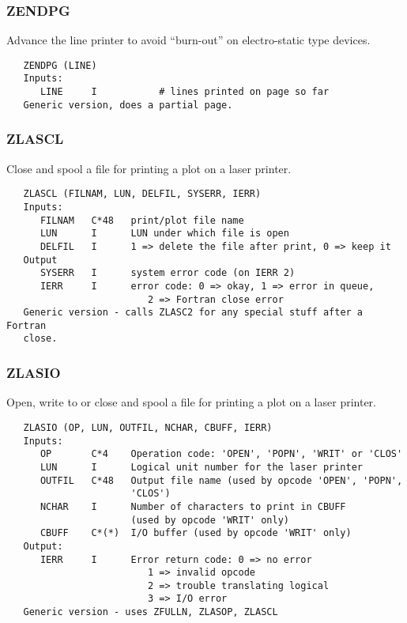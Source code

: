 \subsubsection{ZENDPG}
Advance the line printer to avoid ``burn-out'' on electro-static type
devices.
\begin{verbatim}
   ZENDPG (LINE)
   Inputs:
      LINE     I           # lines printed on page so far
   Generic version, does a partial page.
\end{verbatim}

\subsubsection{ZLASCL}
Close and spool a file for printing a plot on a laser printer.
\begin{verbatim}
   ZLASCL (FILNAM, LUN, DELFIL, SYSERR, IERR)
   Inputs:
      FILNAM   C*48   print/plot file name
      LUN      I      LUN under which file is open
      DELFIL   I      1 => delete the file after print, 0 => keep it
   Output
      SYSERR   I      system error code (on IERR 2)
      IERR     I      error code: 0 => okay, 1 => error in queue,
                         2 => Fortran close error
   Generic version - calls ZLASC2 for any special stuff after a Fortran
   close.
\end{verbatim}

\subsubsection{ZLASIO}
Open, write to or close and spool a file for printing a plot on a
laser printer.
\begin{verbatim}
   ZLASIO (OP, LUN, OUTFIL, NCHAR, CBUFF, IERR)
   Inputs:
      OP       C*4    Operation code: 'OPEN', 'POPN', 'WRIT' or 'CLOS'
      LUN      I      Logical unit number for the laser printer
      OUTFIL   C*48   Output file name (used by opcode 'OPEN', 'POPN',
                      'CLOS')
      NCHAR    I      Number of characters to print in CBUFF
                      (used by opcode 'WRIT' only)
      CBUFF    C*(*)  I/O buffer (used by opcode 'WRIT' only)
   Output:
      IERR     I      Error return code: 0 => no error
                         1 => invalid opcode
                         2 => trouble translating logical
                         3 => I/O error
   Generic version - uses ZFULLN, ZLASOP, ZLASCL
\end{verbatim}

